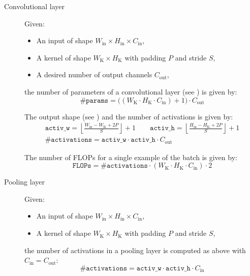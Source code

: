 \begin{description}
\begin{description}
            \item[Convolutional layer]
                Given:
                \begin{itemize}
                    \item An input of shape $W_\text{in} \times H_\text{in} \times C_\text{in}$,
                    \item A kernel of shape $W_\text{K} \times H_\text{K}$ with padding $P$ and stride $S$,
                    \item A desired number of output channels $C_\text{out}$,
                \end{itemize}
                the number of parameters of a convolutional layer (see ) is given by:
                \[ \texttt{\#params} = \big( (W_\text{K} \cdot H_\text{K} \cdot C_\text{in}) + 1 \big) \cdot C_\text{out} \]

                The output shape (see ) and the number of activations is given by:
                \[  
                    \begin{gathered}
                        \texttt{activ\_w} = \left\lfloor \frac{W_\text{in} - W_\text{K} + 2P}{S} \right\rfloor + 1 \hspace{2em}
                        \texttt{activ\_h} = \left\lfloor \frac{H_\text{in} - H_\text{K} + 2P}{S} \right\rfloor + 1 \\
                        \texttt{\#activations} = \texttt{activ\_w} \cdot \texttt{activ\_h} \cdot C_\text{out}
                    \end{gathered}    
                \]

                The number of FLOPs for a single example of the batch is given by:
                \[ \texttt{FLOPs} = \texttt{\#activations} \cdot (W_\text{K} \cdot H_\text{K} \cdot C_\text{in}) \cdot 2 \]

            \item[Pooling layer]
                Given:
                \begin{itemize}
                    \item An input of shape $W_\text{in} \times H_\text{in} \times C_\text{in}$,
                    \item A kernel of shape $W_\text{K} \times H_\text{K}$ with padding $P$ and stride $S$,
                \end{itemize}
                the number of activations in a pooling layer is computed as above with $C_\text{in} = C_\text{out}$:
                \[ \texttt{\#activations} = \texttt{activ\_w} \cdot \texttt{activ\_h} \cdot C_\text{in} \]


\end{description}
\end{description}
